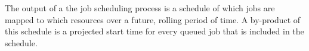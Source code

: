 The output of a the job scheduling process is a schedule of which jobs
are mapped to which resources over a future, rolling period of time.
A by-product of this schedule is a projected start time for every
queued job that is included in the schedule.




